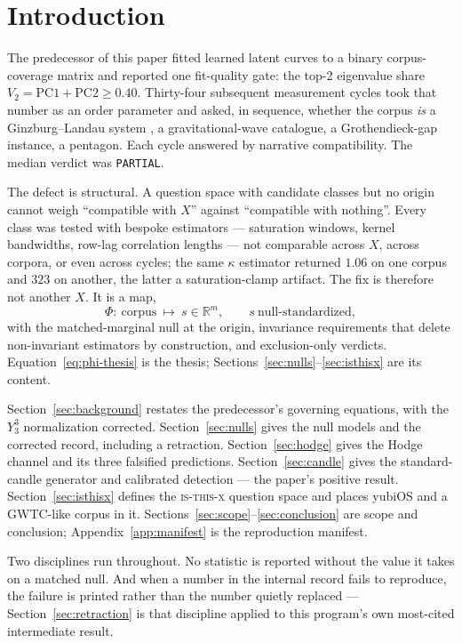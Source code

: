 \documentclass[11pt,a4paper]{article}
\theoremstyle{plain}
\theoremstyle{remark}
\theoremstyle{plain}
\begin{document}
\section{Introduction}
\label{sec:intro}

The predecessor of this paper \citep{llc2026} fitted learned latent curves to a binary corpus-coverage matrix and reported one fit-quality gate: the top-2 eigenvalue share $V_2=\mathrm{PC1}+\mathrm{PC2}\ge0.40$. Thirty-four subsequent measurement cycles took that number as an order parameter and asked, in sequence, whether the corpus \emph{is} a Ginzburg--Landau system \citep{cgl2026,hohenberg2015}, a gravitational-wave catalogue, a Grothendieck-gap instance, a pentagon. Each cycle answered by narrative compatibility. The median verdict was \texttt{PARTIAL}.

The defect is structural. A question space with candidate classes but no origin cannot weigh ``compatible with $X$'' against ``compatible with nothing''. Every class was tested with bespoke estimators --- saturation windows, kernel bandwidths, row-lag correlation lengths --- not comparable across $X$, across corpora, or even across cycles; the same $\kappa$ estimator returned $1.06$ on one corpus and $323$ on another, the latter a saturation-clamp artifact. The fix is therefore not another $X$. It is a map,
\begin{equation}
\Phi:\ \text{corpus}\ \longmapsto\ s\in\mathbb{R}^m,\qquad s\ \text{null-standardized},
\label{eq:phi-thesis}
\end{equation}
with the matched-marginal null at the origin, invariance requirements that delete non-invariant estimators by construction, and exclusion-only verdicts. Equation~\eqref{eq:phi-thesis} is the thesis; Sections~\ref{sec:nulls}--\ref{sec:isthisx} are its content.

Section~\ref{sec:background} restates the predecessor's governing equations, with the $Y_3^3$ normalization corrected. Section~\ref{sec:nulls} gives the null models and the corrected record, including a retraction. Section~\ref{sec:hodge} gives the Hodge channel and its three falsified predictions. Section~\ref{sec:candle} gives the standard-candle generator and calibrated detection --- the paper's positive result. Section~\ref{sec:isthisx} defines the \textsc{is-this-x} question space and places yubiOS and a GWTC-like corpus in it. Sections~\ref{sec:scope}--\ref{sec:conclusion} are scope and conclusion; Appendix~\ref{app:manifest} is the reproduction manifest.

Two disciplines run throughout. No statistic is reported without the value it takes on a matched null. And when a number in the internal record fails to reproduce, the failure is printed rather than the number quietly replaced --- Section~\ref{sec:retraction} is that discipline applied to this program's own most-cited intermediate result.
\end{document}
